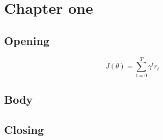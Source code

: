 \chapter{Chapter one}
\section{Opening}
\lipsum[1-40]
\begin{equation}
  J(\theta) = \sum_{t=0}^{T} \gamma^t r_t
\end{equation}
\section{Body}
\lipsum[41-80]
\section{Closing}
\lipsum[81-110]
